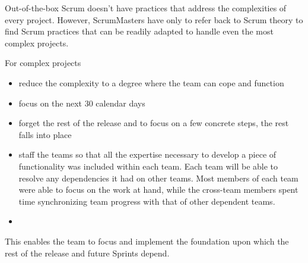 Out-of-the-box Scrum doesn’t have practices that address the complexities of every project. However, ScrumMasters have only to refer back to Scrum theory to find Scrum practices that can be readily adapted to handle even the most complex projects.

For complex projects
\begin{itemize}
For complex projects,like 
  \item reduce the complexity to a degree where the team can cope and function
  \item focus on the next 30 calendar days
  \item forget the rest of the release and to focus on a few concrete steps, the rest falls into place
  \item staff the teams so that all the expertise necessary to develop a piece of functionality was included within each team. Each team will be able to resolve any dependencies it had on other teams. Most members of each team were able to focus on the work at hand, while the cross-team members spent time synchronizing team progress with that of other dependent teams.
  \item 
\end{itemize}

This enables the team to focus and implement the foundation upon which the rest of the release and future Sprints depend.